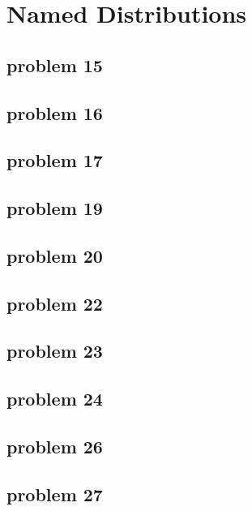 \section{Named Distributions}

\subsection{problem 15}


\subsection{problem 16}


\subsection{problem 17}


\subsection{problem 19}


\subsection{problem 20}


\subsection{problem 22}


\subsection{problem 23}


\subsection{problem 24}


\subsection{problem 26}


\subsection{problem 27}


